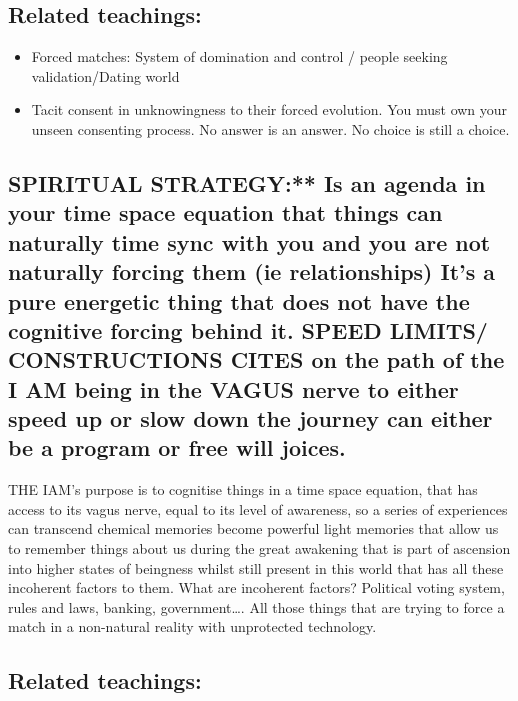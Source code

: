 \subsection{Related teachings:}\label{related-teachings-1}

\begin{itemize}
\item
  Forced matches: System of domination and control / people seeking
  validation/Dating world
\item
  Tacit consent in unknowingness to their forced evolution. You must own
  your unseen consenting process. No answer is an answer. No choice is
  still a choice.
\end{itemize}

\subsection{SPIRITUAL STRATEGY:** Is an agenda in your time space
equation that things can naturally time sync with you and you are not
naturally forcing them (ie relationships) It's a pure energetic thing
that does not have the cognitive forcing behind it. SPEED LIMITS/
CONSTRUCTIONS CITES on the path of the I AM being in the VAGUS nerve to
either speed up or slow down the journey can either be a program or free
will
joices.}\label{spiritual-strategy-is-an-agenda-in-your-time-space-equation-that-things-can-naturally-time-sync-with-you-and-you-are-not-naturally-forcing-them-ie-relationships-its-a-pure-energetic-thing-that-does-not-have-the-cognitive-forcing-behind-it.-speed-limits-constructions-cites-on-the-path-of-the-i-am-being-in-the-vagus-nerve-to-either-speed-up-or-slow-down-the-journey-can-either-be-a-program-or-free-will-joices.}

THE IAM's purpose is to cognitise things in a time space equation, that
has access to its vagus nerve, equal to its level of awareness, so a
series of experiences can transcend chemical memories become powerful
light memories that allow us to remember things about us during the
great awakening that is part of ascension into higher states of
beingness whilst still present in this world that has all these
incoherent factors to them. What are incoherent factors? Political
voting system, rules and laws, banking, government\ldots{}. All those
things that are trying to force a match in a non-natural reality with
unprotected technology.

\subsection{Related teachings:}\label{related-teachings-2}

